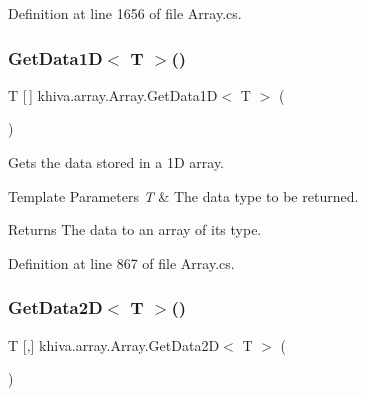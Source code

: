 Definition at line 1656 of file Array.\+cs.

\mbox{\label{classkhiva_1_1array_1_1_array_a7df0163f57f98043ec898c9378a8c1c4}} 
\subsubsection{\texorpdfstring{Get\+Data1\+D$<$ T $>$()}{GetData1D< T >()}}
{\footnotesize\ttfamily T \mbox{[}$\,$\mbox{]} khiva.\+array.\+Array.\+Get\+Data1D$<$ T $>$ (\begin{DoxyParamCaption}{ }\end{DoxyParamCaption})\hspace{0.3cm}{\ttfamily [inline]}}



Gets the data stored in a 1D array. 


\begin{DoxyTemplParams}{Template Parameters}
{\em T} & The data type to be returned.\\
\hline
\end{DoxyTemplParams}
\begin{DoxyReturn}{Returns}
The data to an array of its type.
\end{DoxyReturn}


Definition at line 867 of file Array.\+cs.

\mbox{\label{classkhiva_1_1array_1_1_array_a456b5971538b718b30eb088c05e02326}} 
\subsubsection{\texorpdfstring{Get\+Data2\+D$<$ T $>$()}{GetData2D< T >()}}
{\footnotesize\ttfamily T \mbox{[},\mbox{]} khiva.\+array.\+Array.\+Get\+Data2D$<$ T $>$ (\begin{DoxyParamCaption}{ }\end{DoxyParamCaption})\hspace{0.3cm}{\ttfamily [inline]}}



